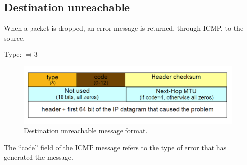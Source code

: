 \subsection{Destination unreachable}
When a packet is dropped, an error message is returned, through ICMP, to the source.
\begin{center}
Type: $\Rightarrow 3$\\
\end{center}
\begin{figure}[H]
\centering
\includegraphics[scale=0.35, angle=0]{./Images/ICMP/Destination_unreachable}
\caption{\footnotesize{Destination unreachable message format.}}
\end{figure}
The “code” field of the ICMP message refers to the type of error that has generated the message. 
